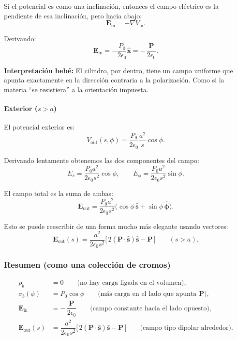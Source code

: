 \documentclass{article}
\begin{document}
Si el potencial es como una inclinación, entonces el campo eléctrico es la
pendiente de esa inclinación, pero hacia abajo:
\[
\mathbf{E}_{\text{in}} = -\nabla V_{\text{in}}.
\]

Derivando:
\[
\mathbf{E}_{\text{in}}
= -\frac{P_{0}}{2\epsilon_{0}}\hat{\mathbf{x}}
= -\,\frac{\mathbf{P}}{2\epsilon_{0}}.
\]

\textbf{Interpretación bebé:}  
El cilindro, por dentro, tiene un campo uniforme que apunta exactamente en la
dirección contraria a la polarización. Como si la materia “se resistiera” a la
orientación impuesta.

\paragraph{Exterior ($s>a$)}

El potencial exterior es:
\[
V_{\text{out}}(s,\phi)
= \frac{P_{0}}{2\epsilon_{0}}\frac{a^{2}}{s}\cos\phi.
\]

Derivando lentamente obtenemos las dos componentes del campo:
\[
E_{s}
= \frac{P_{0}a^{2}}{2\epsilon_{0}s^{2}}\cos\phi,
\qquad
E_{\phi}
= \frac{P_{0}a^{2}}{2\epsilon_{0}s^{2}}\sin\phi.
\]

El campo total es la suma de ambas:
\[
\mathbf{E}_{\text{out}}
= \frac{P_{0}a^{2}}{2\epsilon_{0}s^{2}}
   \bigl(\cos\phi\,\hat{\mathbf{s}}
        + \sin\phi\,\hat{\boldsymbol{\phi}}\bigr).
\]

Esto se puede reescribir de una forma mucho más elegante usando vectores:
\[
\boxed{
\mathbf{E}_{\text{out}}(s)
= \frac{a^{2}}{2\epsilon_{0}s^{2}}
  \bigl[\,2(\mathbf{P}\cdot\hat{\mathbf{s}})\hat{\mathbf{s}}
        - \mathbf{P}\,\bigr]
}
\qquad (s>a).
\]

\subsubsection*{Resumen (como una colección de cromos)}

\begin{align}
\rho_{b} &= 0 
\qquad\text{(no hay carga ligada en el volumen)},\\[4pt]
\sigma_{b}(\phi) &= P_{0}\cos\phi 
\qquad\text{(más carga en el lado que apunta $\mathbf{P}$)},\\[4pt]
\mathbf{E}_{\text{in}} &= -\,\dfrac{\mathbf{P}}{2\epsilon_{0}}
\qquad\text{(campo constante hacia el lado opuesto)},\\[4pt]
\mathbf{E}_{\text{out}}(s)
&= \dfrac{a^{2}}{2\epsilon_{0}s^{2}}
   \bigl[\,2(\mathbf{P}\cdot\hat{\mathbf{s}})\hat{\mathbf{s}}
        - \mathbf{P}\,\bigr]
\qquad\text{(campo tipo dipolar alrededor)}.
\end{align}
\end{document}
